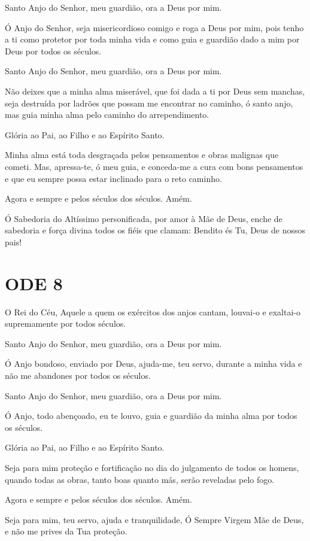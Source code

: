 \documentclass{subfiles}
\begin{document}
Santo Anjo do Senhor, meu guardião, ora a Deus por mim.

Ó Anjo do Senhor, seja misericordioso comigo e roga a Deus por mim,
pois tenho a ti como protetor por toda minha vida e como guia e guardião dado
a mim por Deus por todos os séculos.

Santo Anjo do Senhor, meu guardião, ora a Deus por mim.

Não deixes que a minha alma miserável, que foi dada a ti por Deus sem
manchas, seja destruída por ladrões que possam me encontrar no caminho, ó
santo anjo, mas guia minha alma pelo caminho do arrependimento.

Glória ao Pai, ao Filho e ao Espírito Santo.

Minha alma está toda desgraçada pelos pensamentos e obras malignas
que cometi. Mas, apressa-te, ó meu guia, e conceda-me a cura com bons
pensamentos e que eu sempre possa estar inclinado para o reto caminho.

Agora e sempre e pelos séculos dos séculos. Amém.

Ó Sabedoria do Altíssimo personificada, por amor à Mãe de Deus,
enche de sabedoria e força divina todos os fiéis que clamam: Bendito és Tu,
Deus de nossos pais!

\section*{ODE 8}

\eirmos{}O Rei do Céu, Aquele a quem os exércitos dos anjos cantam, louvai-o e
exaltai-o supremamente por todos séculos.

Santo Anjo do Senhor, meu guardião, ora a Deus por mim.

Ó Anjo bondoso, enviado por Deus, ajuda-me, teu servo, durante a
minha vida e não me abandones por todos os séculos.

Santo Anjo do Senhor, meu guardião, ora a Deus por mim.

Ó Anjo, todo abençoado, eu te louvo, guia e guardião da minha alma
por todos os séculos.

Glória ao Pai, ao Filho e ao Espírito Santo.

Seja para mim proteção e fortificação no dia do julgamento de todos
os homens, quando todas as obras, tanto boas quanto más, serão reveladas
pelo fogo.

Agora e sempre e pelos séculos dos séculos. Amém.

Seja para mim, teu servo, ajuda e tranquilidade, Ó Sempre Virgem Mãe
de Deus, e não me prives da Tua proteção.
\end{document}
